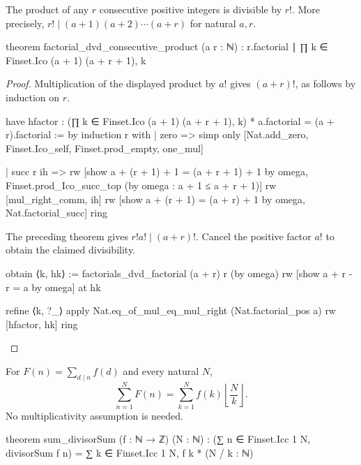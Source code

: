 \begin{theorem}
  \label{ent:thm:factorial-dvd-consecutive-product}
  The product of any $r$ consecutive positive integers is divisible by $r!
  $.
  More precisely, $r!
    \mid(a+1)(a+2)\cdots(a+r)$ for natural $a,r$.

  \begin{lean}
    theorem factorial_dvd_consecutive_product (a r : ℕ) :
        r.factorial ∣ ∏ k ∈ Finset.Ico (a + 1) (a + r + 1), k
  \end{lean}
\end{theorem}

\begin{proof}
  Multiplication of the displayed product by $a!
  $ gives $(a+r)!$, as follows by induction on $r$.

  \begin{lean}
    have hfactor : (∏ k ∈ Finset.Ico (a + 1) (a + r + 1), k) * a.factorial =
        (a + r).factorial := by
      induction r with
      | zero => simp only [Nat.add_zero, Finset.Ico_self, Finset.prod_empty, one_mul]

      | succ r ih =>
        rw [show a + (r + 1) + 1 = (a + r + 1) + 1 by omega,
          Finset.prod_Ico_succ_top (by omega : a + 1 ≤ a + r + 1)]
        rw [mul_right_comm, ih]
        rw [show a + (r + 1) = (a + r) + 1 by omega, Nat.factorial_succ]
        ring
  \end{lean}

  The preceding theorem gives $r!
    a!\mid(a+r)!$.
  Cancel the positive factor $a!
  $ to obtain the claimed divisibility.

  \begin{lean}
    obtain ⟨k, hk⟩ := factorials_dvd_factorial (a + r) r (by omega)
    rw [show a + r - r = a by omega] at hk

    refine ⟨k, ?_⟩
    apply Nat.eq_of_mul_eq_mul_right (Nat.factorial_pos a)
    rw [hfactor, hk]
    ring
  \end{lean}
\end{proof}

\begin{theorem}
  \label{ent:thm:sum-divisorsum}
  For $F(n)=\sum_{d\mid n}f(d)$ and every natural $N$, \[ \sum_{n=1}^N F(n)=\sum_{k=1}^N f(k)\left\lfloor\frac Nk\right\rfloor. \] No multiplicativity assumption is needed.

  \begin{lean}
    theorem sum_divisorSum (f : ℕ → ℤ) (N : ℕ) :
        (∑ n ∈ Finset.Icc 1 N, divisorSum f n) =
          ∑ k ∈ Finset.Icc 1 N, f k * (N / k : ℕ)
  \end{lean}
\end{theorem}

